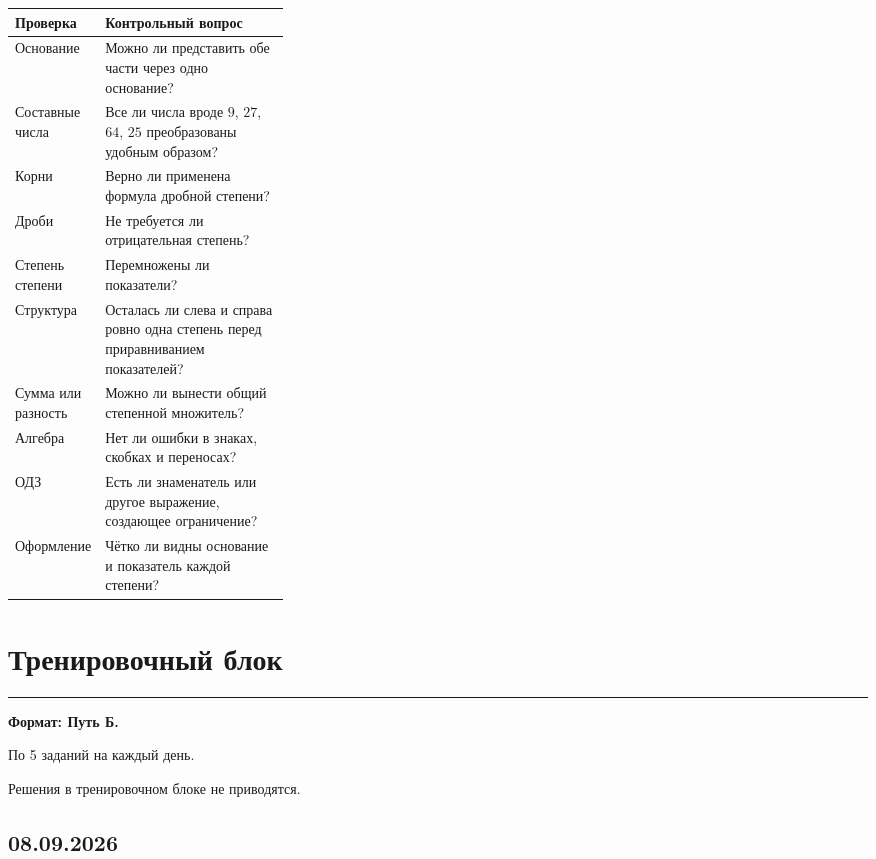 \documentclass[a4paper,12pt]{article}
\newcommand{\sectionline}{\par\vspace{0.15em}\noindent\textcolor{accent}{\rule{\linewidth}{0.7pt}}\par\vspace{0.2em}}
\begin{document}
\begin{tabularx}{\linewidth}{@{}p{0.32\linewidth}X@{}}
\toprule
\textbf{Проверка} & \textbf{Контрольный вопрос} \\
\midrule
Основание &
Можно ли представить обе части через одно основание? \\

Составные числа &
Все ли числа вроде \(9\), \(27\), \(64\), \(25\) преобразованы удобным образом? \\

Корни &
Верно ли применена формула дробной степени? \\

Дроби &
Не требуется ли отрицательная степень? \\

Степень степени &
Перемножены ли показатели? \\

Структура &
Осталась ли слева и справа ровно одна степень перед приравниванием показателей? \\

Сумма или разность &
Можно ли вынести общий степенной множитель? \\

Алгебра &
Нет ли ошибки в знаках, скобках и переносах? \\

ОДЗ &
Есть ли знаменатель или другое выражение, создающее ограничение? \\

Оформление &
Чётко ли видны основание и показатель каждой степени? \\
\bottomrule
\end{tabularx}


\clearpage

\section*{Тренировочный блок}
\sectionline

\textbf{Формат: Путь Б.}

По 5 заданий на каждый день.

Решения в тренировочном блоке не приводятся.


\subsection*{08.09.2026}
\end{document}
